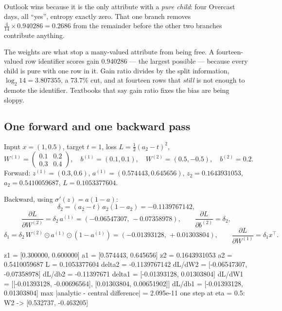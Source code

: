 \documentclass[11pt]{article}
\begin{document}
Outlook wins because it is the only attribute with a \emph{pure child}: four
Overcast days, all ``yes'', entropy exactly zero. That one branch removes
$\frac{4}{14} \times 0.940286 = 0.2686$ from the remainder before the other
two branches contribute anything.

\begin{caution}
The weights are what stop a many-valued attribute from being free. A
fourteen-valued row identifier scores gain $0.940286$ --- the largest possible
--- because every child is pure with one row in it. Gain ratio divides by the
split information, $\log_2 14 = 3.807355$, a $73.7\%$ cut, and at fourteen
rows that \emph{still} is not enough to demote the identifier. Textbooks that
say gain ratio fixes the bias are being sloppy.
\end{caution}

\subsection{One forward and one backward pass}

\begin{worked}
Input $x = (1, 0.5)$, target $t = 1$, loss $L = \tfrac12(a_2 - t)^2$,
\[
  W^{(1)} = \begin{pmatrix} 0.1 & 0.2 \\ 0.3 & 0.4 \end{pmatrix},\quad
  b^{(1)} = (0.1, 0.1),\quad
  W^{(2)} = (0.5, -0.5),\quad b^{(2)} = 0.2 .
\]
Forward: $z^{(1)} = (0.3, 0.6)$, $a^{(1)} = (0.574443, 0.645656)$,
$z_2 = 0.1643931053$, $a_2 = 0.5410059687$, $L = 0.1053377604$.

Backward, using $\sigma'(z) = a(1-a)$:
\[
  \delta_2 = (a_2 - t)\,a_2(1 - a_2) = -0.1139767142,
\]
\[
  \frac{\partial L}{\partial W^{(2)}} = \delta_2\, a^{(1)}
    = (-0.06547307,\, -0.07358978), \qquad
  \frac{\partial L}{\partial b^{(2)}} = \delta_2 ,
\]
\[
  \delta_1 = \delta_2\, W^{(2)} \odot a^{(1)} \odot (1 - a^{(1)})
    = (-0.01393128,\, +0.01303804), \qquad
  \frac{\partial L}{\partial W^{(1)}} = \delta_1 x^\top .
\]
\end{worked}

\begin{codeout}
z1 = [0.300000, 0.600000]   a1 = [0.574443, 0.645656]
z2 = 0.1643931053   a2 = 0.5410059687   L = 0.1053377604
delta2 = -0.1139767142
dL/dW2 = [-0.06547307, -0.07358978]   dL/db2 = -0.11397671
delta1 = [-0.01393128, 0.01303804]
dL/dW1 = [[-0.01393128, -0.00696564], [0.01303804, 0.00651902]]
dL/db1 = [-0.01393128, 0.01303804]
max |analytic - central difference| = 2.095e-11
one step at eta = 0.5: W2 -> [0.532737, -0.463205]
\end{codeout}
\end{document}
